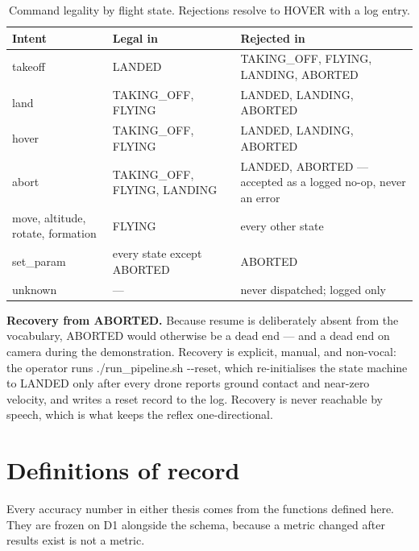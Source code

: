 \documentclass[11pt,a4paper]{article}
\newcommand{\code}[1]{{\ttfamily\small #1}}
\begin{document}
\begin{table}[htbp]
\centering
\caption{Command legality by flight state. Rejections resolve to \code{HOVER} with a log entry.}
\label{tab:states}
\small
\begin{tabular}{@{}P{0.20}P{0.36}P{0.34}@{}}
\toprule
\textbf{Intent} & \textbf{Legal in} & \textbf{Rejected in} \\
\midrule
\code{takeoff}   & \code{LANDED} & \code{TAKING\_OFF}, \code{FLYING}, \code{LANDING}, \code{ABORTED} \\
\code{land}      & \code{TAKING\_OFF}, \code{FLYING} & \code{LANDED}, \code{LANDING}, \code{ABORTED} \\
\code{hover}     & \code{TAKING\_OFF}, \code{FLYING} & \code{LANDED}, \code{LANDING}, \code{ABORTED} \\
\code{abort}     & \code{TAKING\_OFF}, \code{FLYING}, \code{LANDING} & \code{LANDED}, \code{ABORTED}
  --- accepted as a logged no-op, never an error \\
\code{move}, \code{altitude}, \code{rotate}, \code{formation} & \code{FLYING} & every other state \\
\code{set\_param} & every state except \code{ABORTED} & \code{ABORTED} \\
\code{unknown}   & --- & never dispatched; logged only \\
\bottomrule
\end{tabular}
\end{table}

\textbf{Recovery from \code{ABORTED}.} Because \code{resume} is deliberately absent from the vocabulary,
\code{ABORTED} would otherwise be a dead end --- and a dead end on camera during the demonstration.
Recovery is explicit, manual, and non-vocal: the operator runs \code{./run\_pipeline.sh -{}-reset}, which
re-initialises the state machine to \code{LANDED} only after every drone reports ground contact and
near-zero velocity, and writes a reset record to the log. Recovery is never reachable by speech, which is
what keeps the reflex one-directional.

\section{Definitions of record}
\label{sec:defs}

Every accuracy number in either thesis comes from the functions defined here. They are frozen on D1
alongside the schema, because a metric changed after results exist is not a metric.
\end{document}
